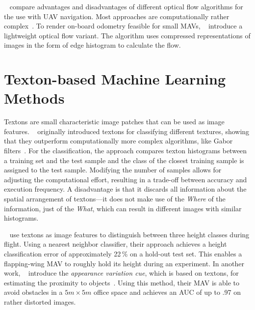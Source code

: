 \documentclass{report}
\begin{document}
\citeauthor{chao2013survey}~\cite{chao2013survey} compare advantages
and disadvantages of different optical flow algorithms for the use
with UAV navigation. Most approaches are computationally rather
complex~\cite{mcguire2016local}. To render on-board odometry feasible
for small MAVs, \citeauthor{mcguire2016local}~\cite{mcguire2016local}
introduce a lightweight optical flow variant. The algorithm uses
compressed representations of images in the form of edge histogram to
calculate the flow.

\section{Texton-based Machine Learning Methods}
\label{sec:textonbasedapproaches}

Textons are small characteristic image patches that can be used as
image
features. \citeauthor{varma2005statistical}~\cite{varma2005statistical}
originally introduced textons for classifying different textures,
showing that they outperform computationally more complex algorithms,
like Gabor filters~\cite{varma2005statistical}. For the
classification, the approach compares texton histograms between a
training set and the test sample and the class of the closest training
sample is assigned to the test
sample. %
Modifying the number of samples allows for adjusting the computational
effort, resulting in a trade-off between accuracy and execution
frequency. A disadvantage is that it discards all information about
the spatial arrangement of textons---it does not make use of the
\emph{Where} of the information, just of the \emph{What}, which can
result in different images with similar histograms.

\citeauthor{de2009design}~\cite{de2009design} use textons as image
features to distinguish between three height classes during
flight. Using a nearest neighbor classifier, their approach achieves a
height classification error of approximately 22\,\% on a hold-out test
set.  This enables a flapping-wing MAV to roughly hold its height
during an experiment. In another work,
\citeauthor{de2012appearance}~\cite{de2012appearance} introduce the
\emph{appearance variation cue}, which is based on textons, for
estimating the proximity to objects~\cite{de2012appearance}.
Using this method, their MAV is able to avoid obstacles in a
$5m \times 5m$ office space and achieves an AUC of up to .97 on rather
distorted images.
\end{document}
